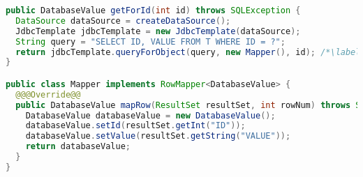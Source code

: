 

\begin{lstlisting}[language=Java, caption={Example of loading data using Spring JDBC Framework}, label={code:jdbcTemplate}]
public DatabaseValue getForId(int id) throws SQLException {
  DataSource dataSource = createDataSource();
  JdbcTemplate jdbcTemplate = new JdbcTemplate(dataSource);
  String query = "SELECT ID, VALUE FROM T WHERE ID = ?";
  return jdbcTemplate.queryForObject(query, new Mapper(), id); /*\label{code:jdbcTemplate:return}*/
}

public class Mapper implements RowMapper<DatabaseValue> {
  @@@Override@@
  public DatabaseValue mapRow(ResultSet resultSet, int rowNum) throws SQLException {
    DatabaseValue databaseValue = new DatabaseValue();
    databaseValue.setId(resultSet.getInt("ID"));
    databaseValue.setValue(resultSet.getString("VALUE"));
    return databaseValue;
  }
}
\end{lstlisting}

